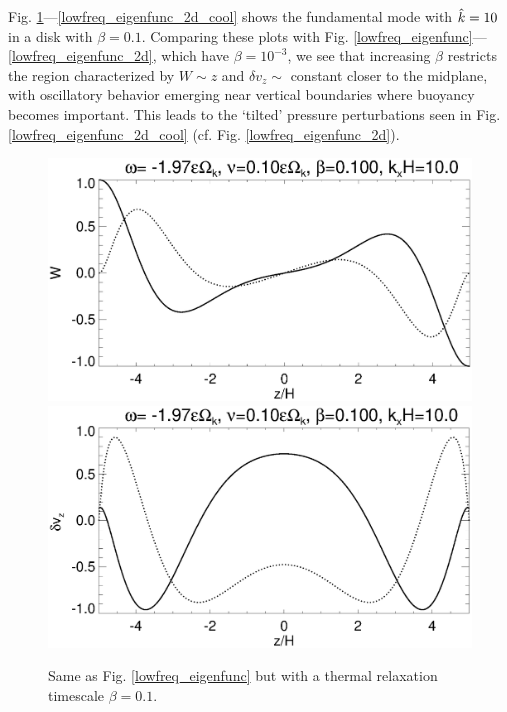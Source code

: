 Fig. \ref{lowfreq_eigenfunc_cool}---\ref{lowfreq_eigenfunc_2d_cool}
shows the fundamental mode with $\hat{k}=10$ in a disk with 
$\beta=0.1$. Comparing these plots with
Fig. \ref{lowfreq_eigenfunc}---\ref{lowfreq_eigenfunc_2d}, which have
$\beta=10^{-3}$, we see that increasing $\beta$ restricts the region 
characterized by $W\sim z$ and $\delta v_z\sim$ constant closer to the
midplane, with oscillatory behavior emerging near vertical boundaries
where buoyancy becomes important. This leads to the `tilted' pressure
perturbations seen in Fig. \ref{lowfreq_eigenfunc_2d_cool} 
(cf. Fig. \ref{lowfreq_eigenfunc_2d}). 

\begin{figure}
  \includegraphics[width=\linewidth,clip=true,trim=0cm 1.75cm 0cm
  0cm]{figures/eigenvectorW_beta0d1} 
  \includegraphics[width=\linewidth,clip=true,trim=0cm 0cm 0cm
  1cm]{figures/eigenvectorvz_beta0d1}
  \caption{Same as Fig. \ref{lowfreq_eigenfunc} but with a
    thermal relaxation timescale $\beta=0.1$. 
    \label{lowfreq_eigenfunc_cool}
  }
\end{figure}

